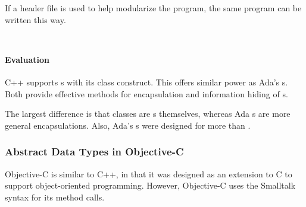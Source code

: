 If a header file is used to help modularize the program, the same program can be written this way.
\inputminted[frame=lines,linenos]{c++}{./EDAP05-Concepts_Programming_Languages-Sections/Abstract_Data_Types/Code/Class_Example-Stack-Header-CPP.hpp}
\inputminted[frame=lines,linenos]{c++}{./EDAP05-Concepts_Programming_Languages-Sections/Abstract_Data_Types/Code/Class_Example-Stack-Header-CPP.cpp}

\paragraph{Evaluation}\label{par:C++_Abstract_Data_Type_Evaluation}
C++ supports s with its class construct.
This offers similar power as Ada's s.
Both provide effective methods for encapsulation and information hiding of s.

The largest difference is that classes are s themselves, whereas Ada s are more general encapsulations.
Also, Ada's s were designed for more than .

\subsubsection{Abstract Data Types in Objective-C}\label{subsubsec:Abstract_Data_Types_Objective_C}
Objective-C is similar to C++, in that it was designed as an extension to C to support object-oriented programming.
However, Objective-C uses the Smalltalk syntax for its method calls.

